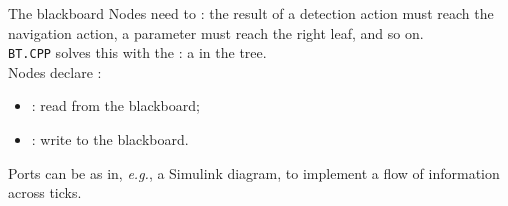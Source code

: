\begin{frame}{The blackboard}
  \justifying
  Nodes need to : the result of a detection action must reach the navigation action, a parameter must reach the right leaf, and so on.\\
  \bigskip
  \texttt{BT.CPP} solves this with the : a  in the tree.\\
  \bigskip
  Nodes declare :
  \begin{itemize}
    \item {}: read from the blackboard;
    \item {}: write to the blackboard.
  \end{itemize}
  Ports can be  as in, \emph{e.g.}, a Simulink diagram, to implement a flow of information across ticks.
\end{frame}

